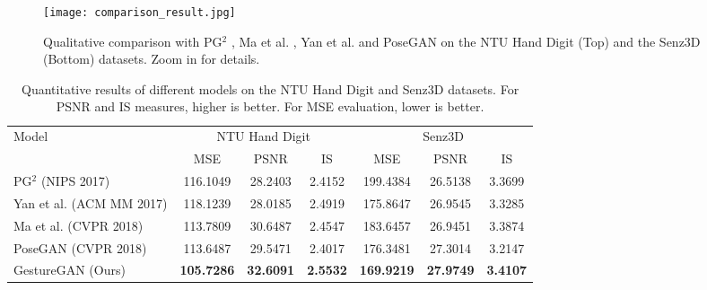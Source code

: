 \documentclass[sigconf]{acmart}
\begin{document}
\begin{figure*}[!t] \tiny
	\centering
	\texttt{[image: comparison\_result.jpg]}
	\caption{Qualitative comparison with PG$^2$ \cite{ma2017pose}, Ma et al. \cite{ma2017disentangled}, Yan et al. \cite{yan2017skeleton} and PoseGAN \cite{siarohin2017deformable} on the NTU Hand Digit (Top) and the Senz3D (Bottom) datasets. Zoom in for details.}
	\label{fig:comparsion}
\end{figure*}

\begin{table*}[!t] \small
	\centering
	\vspace{-0.2cm}
	\caption{Quantitative results of different models on the NTU Hand Digit and Senz3D datasets. For PSNR and IS measures, higher is better. For MSE evaluation, lower is better.}
	\begin{tabular}{l|c|c|c|c|c|c} \toprule
		\multirow{2}{*}{Model} & \multicolumn{3}{c|}{NTU Hand Digit \cite{liu2016deepfashion}}& \multicolumn{3}{c}{Senz3D \cite{memo2016head}}   \\ \cline{2-7}
		& MSE               & PSNR             & IS              & MSE               & PSNR             & IS     \\ \midrule			
		PG$^2$ \cite{ma2017pose}  (NIPS 2017)                                        & 116.1049          & 28.2403          & 2.4152          & 199.4384          & 26.5138          & 3.3699 \\ \hline
		Yan et al. \cite{yan2017skeleton} (ACM MM 2017)                              & 118.1239          & 28.0185          & 2.4919          & 175.8647          & 26.9545          & 3.3285 \\ \hline
		Ma et al. \cite{ma2017disentangled} (CVPR 2018)                              & 113.7809          & 30.6487          & 2.4547          & 183.6457          & 26.9451          & 3.3874 \\ \hline 
		PoseGAN \cite{siarohin2017deformable} (CVPR 2018)                            & 113.6487          & 29.5471          & 2.4017          & 176.3481          & 27.3014          & 3.2147 \\ \hline \hline
		GestureGAN (Ours)                                                            & \textbf{105.7286} & \textbf{32.6091} & \textbf{2.5532 }         & \textbf{169.9219} & \textbf{27.9749}          & \textbf{3.4107} \\ \bottomrule		
	\end{tabular}
	\label{tab:baseline}
	\vspace{-0.2cm}
\end{table*}
\end{document}
